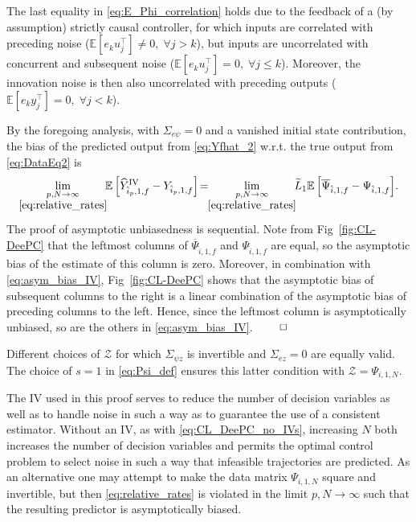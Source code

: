 The last equality in \eqref{eq:E_Phi_correlation} holds due to the feedback of a (by assumption) strictly causal controller, for which inputs are correlated with preceding noise (${\mathbb{E}[e_k u_j^\top]\neq0,\; \forall j>k}$), but inputs are uncorrelated with concurrent and subsequent noise (${\mathbb{E}[e_k u_j^\top]=0,\; \forall j\leq k}$). Moreover, the innovation noise is then also uncorrelated with preceding outputs (${\mathbb{E}[e_k y_j^\top]=0,\; \forall j<k}$).

By the foregoing analysis, with $\Sigma_{e\psi}=0$ and a vanished initial state contribution, the bias of the predicted output from \eqref{eq:Yfhat_2} w.r.t. the true output from \eqref{eq:DataEq2} is
\begin{align}\label{eq:asym_bias_IV}
    \lim_{\underset{\eqref{eq:relative_rates}}{p,N\rightarrow\infty}}\!\!\mathbb{E}\left[\widehat{Y}_{\hat{i}_p,1,f}^\mathrm{IV}-Y_{\hat{i}_p,1,f}\right]\!=\!\!\lim_{\underset{\eqref{eq:relative_rates}}{p,N\rightarrow\infty}}\!\!\widetilde{L}_1\mathbb{E}\left[\overline{\Psi}_{\hat{i},1,f}-\Psi_{\hat{i},1,f}\right]\!.
\end{align}
The proof of asymptotic unbiasedness is sequential. Note from Fig~\ref{fig:CL-DeePC} that the leftmost columns of $\overline{\Psi}_{\hat{i},1,f}$ and $\Psi_{\hat{i},1,f}$ are equal, so the asymptotic bias of the estimate of this column is zero. Moreover, in combination with \eqref{eq:asym_bias_IV}, Fig~\ref{fig:CL-DeePC} shows that the asymptotic bias of subsequent columns to the right is a linear combination of the asymptotic bias of preceding columns to the left. Hence, since the leftmost column is asymptotically unbiased, so are the others in \eqref{eq:asym_bias_IV}. $\hfill\qed$
\setcounter{thm}{0}
\begin{rem}
    Different choices of $\mathcal{Z}$ for which $\Sigma_{\psi z}$ is invertible and $\Sigma_{ez}=0$ are equally valid. The choice of $s=1$ in \eqref{eq:Psi_def} ensures this latter condition with $\mathcal{Z}=\Psi_{i,1,N}$.
\end{rem}
\begin{rem}
    The \ac{IV} used in this proof serves to reduce the number of decision variables as well as to handle noise in such a way as to guarantee the use of a consistent estimator. Without an \ac{IV}, as with \eqref{eq:CL_DeePC_no_IVs}, increasing $N$ both increases the number of decision variables and permits the optimal control problem to select noise in such a way that infeasible trajectories are predicted. As an alternative one may attempt to make the data matrix $\Psi_{i,1,N}$ square and invertible, but then \eqref{eq:relative_rates} is violated in the limit $p,N\rightarrow\infty$ such that the resulting predictor is asymptotically biased.
\end{rem}
